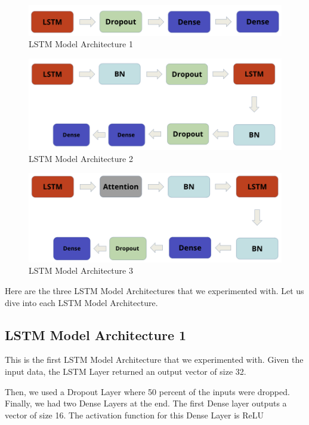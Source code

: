 \documentclass[11pt]{article}
\begin{document}
\begin{figure}[h!]
	\includegraphics[width= 0.9 \linewidth]{LSTM(1).png}
	\centering
	\caption{LSTM Model Architecture 1}
	\label{LSTM(1).png}
\end{figure}

\begin{figure}[h!]
	\includegraphics[width= 0.9 \linewidth]{LSTM(2).png}
	\centering
	\caption{LSTM Model Architecture 2}
	\label{LSTM(2).png}
\end{figure}


\begin{figure}[h!]
	\includegraphics[width= 0.9 \linewidth]{LSTM(3).png}
	\centering
	\caption{LSTM Model Architecture 3}
	\label{LSTM(3).png}
\end{figure}

Here are the three LSTM Model Architectures that we experimented with. Let us dive into each LSTM Model Architecture. 
\subsection{LSTM Model Architecture 1}
This is the first LSTM Model Architecture that we experimented with. Given the input data, the LSTM Layer returned an output vector of size 32. \newline 

Then, we used a Dropout Layer where 50 percent of the inputs were dropped. Finally, we had two Dense Layers at the end. The first Dense layer outputs a vector of size 16. The activation function for this Dense Layer is ReLU \newline 
\end{document}
